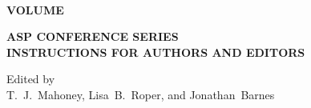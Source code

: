 \null
\setlength{\headheight}{0cm}
\setlength{\headsep}{0cm}
\setlength{\textheight}{21.6cm}
\setlength{\footskip}{0cm}
\pagestyle{empty}

\vfill
\begin{figure}[!h]
\end{figure}

\begin{center}

\hrulefill\\
{\LARGE \bfseries
\bigskip
VOLUME~\volume\\
\bigskip
}
\end{center}

\begin{center}
{\LARGE \bfseries ASP CONFERENCE SERIES\\
{\Large INSTRUCTIONS FOR AUTHORS AND
EDITORS\\}}
\end{center}
\vfill


\begin{center}
{\Large
Edited by\\
\vspace{0.05in}
T.~J.~Mahoney, Lisa~B.~Roper, and Jonathan~Barnes
}
\end{center}

\pagebreak

\bookblankpage
